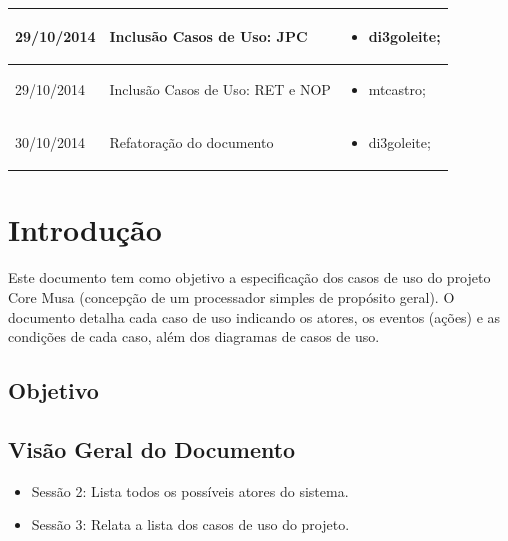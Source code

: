 \documentclass{article}
\begin{document}
\begin{table}[ht]
\begin{tabular}[pos]{|m{2cm} | m{7.2cm} | m{3.8cm}|}
	  \small 29/10/2014 & \small Inclusão Casos de Uso: JPC & \small 
	  \begin{itemize}
	  	\item di3goleite; 
	  \end{itemize}  
	  \\ \hline
	  
	  \small 29/10/2014 & \small Inclusão Casos de Uso: RET e NOP & \small 
      \begin{itemize}
      	\item mtcastro; 
	  \end{itemize}  
	  \\ \hline
	  
	  \small 30/10/2014 & \small Refatoração do documento & \small 
	  \begin{itemize}
	  	\item di3goleite; 
	  \end{itemize}  
	  \\ \hline
	  
    \end{tabular}
  \end{table}

\newpage

\tableofcontents
\newpage

\section{Introdução}
Este documento tem como objetivo a especificação dos casos de uso do projeto Core Musa (concepção de um processador simples de propósito geral). O documento detalha cada caso de uso indicando os atores, os eventos (ações) e as condições de cada caso, além dos diagramas de casos de uso.

  \subsection{Objetivo}
  
  \subsection{Visão Geral do Documento}
  \begin{itemize}
    \item Sessão 2: Lista todos os possíveis atores do sistema.
    \item Sessão 3: Relata a lista dos casos de uso do projeto.
  \end{itemize}
  
\end{document}
